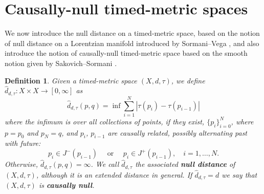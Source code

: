 \documentclass[a4paper,12pt,reqno]{amsart}
\theoremstyle{plain}
\newtheorem{defn}[thm]{Definition}
\newcommand{\be}{\begin{equation}}
\newcommand{\ee}{\end{equation}}
\begin{document}
\section{Causally-null timed-metric spaces}\label{s:causally-null tms}

We now introduce the null distance on a timed-metric space, based on the notion of null distance on a Lorentzian manifold introduced by Sormani--Vega
\cite{SV-Null}, and also introduce the notion of causally-null timed-metric space based on the smooth notion given by Sakovich--Sormani \cite{SakSor-Notions}.



\begin{defn}\label{defn:null-distance}
Given a timed-metric space $(X,d,\tau)$, 
we define $\hat{d}_{d,\tau}: X \times X \to [0, \infty]$
as
\be\label{eq:null}
\hat{d}_{d,\tau}(p,q)=\inf \sum_{i=1}^{N} |\tau(p_i)-\tau(p_{i-1})| 
\ee
where the infimum is over all collections of points, if they exist, $\{p_i\}_{i=0}^{N}$, where  
$p=p_{0}$ and $p_{N}=q$, and $p_i$, $p_{i-1}$ are causally related, possibly alternating past
with future:
\be\label{eq:null-points}
p_i\in J^-(p_{i-1}) \quad \text{ or } \quad p_i \in J^+(p_{i-1}), \quad 
 i=1,\ldots,N.
\ee
Otherwise, $\hat{d}_{d,\tau}(p,q)=\infty$. 
We call $\hat{d}_{d,\tau}$ the  associated \textbf{null distance} of 
$(X,d,\tau)$, although it is an extended distance in general. If $\hat{d}_{d,\tau}=d$ we say that $(X,d,\tau)$ is \textbf{causally null}.  
\end{defn}












\bigskip 
\end{document}
